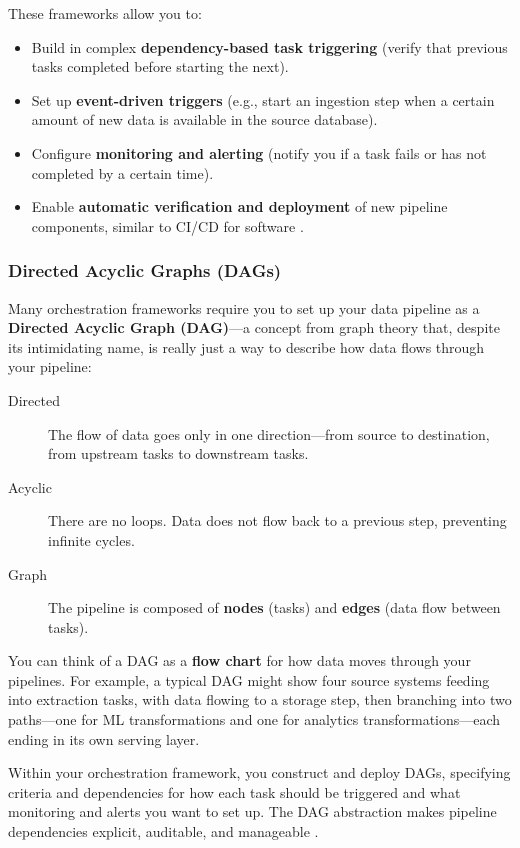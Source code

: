 \documentclass{article}
\begin{document}
\begin{description}
    These frameworks allow you to:
    \begin{itemize}
        \item Build in complex \textbf{dependency-based task triggering} (verify that previous tasks completed before starting the next).
        \item Set up \textbf{event-driven triggers} (e.g., start an ingestion step when a certain amount of new data is available in the source database).
        \item Configure \textbf{monitoring and alerting} (notify you if a task fails or has not completed by a certain time).
        \item Enable \textbf{automatic verification and deployment} of new pipeline components, similar to CI/CD for software \cite{humble2010continuous}.
    \end{itemize}
\end{description}

\subsubsection{Directed Acyclic Graphs (DAGs)}
Many orchestration frameworks require you to set up your data pipeline as a \textbf{Directed Acyclic Graph (DAG)}---a concept from graph theory that, despite its intimidating name, is really just a way to describe how data flows through your pipeline:

\begin{description}
    \item[Directed] The flow of data goes only in one direction---from source to destination, from upstream tasks to downstream tasks.
    \item[Acyclic] There are no loops. Data does not flow back to a previous step, preventing infinite cycles.
    \item[Graph] The pipeline is composed of \textbf{nodes} (tasks) and \textbf{edges} (data flow between tasks).
\end{description}

You can think of a DAG as a \textbf{flow chart} for how data moves through your pipelines. For example, a typical DAG might show four source systems feeding into extraction tasks, with data flowing to a storage step, then branching into two paths---one for ML transformations and one for analytics transformations---each ending in its own serving layer.

Within your orchestration framework, you construct and deploy DAGs, specifying criteria and dependencies for how each task should be triggered and what monitoring and alerts you want to set up. The DAG abstraction makes pipeline dependencies explicit, auditable, and manageable \cite{reis2022fundamentals}.
\end{document}
